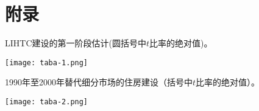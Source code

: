 \documentclass[lang=cn,11pt,a4paper]{paper}
\begin{document}
\section*{附录}

\begin{table}[h]
  \caption{LIHTC建设的第一阶段估计(圆括号中$t$比率的绝对值)。}\label{taba-1}
  \texttt{[image: taba-1.png]}
\noindent{}
\end{table}

\begin{table}[h]
  \caption{1990年至2000年替代细分市场的住房建设（括号中$t$比率的绝对值）。}\label{taba-2}
  \texttt{[image: taba-2.png]}
\end{table}


\end{document}
